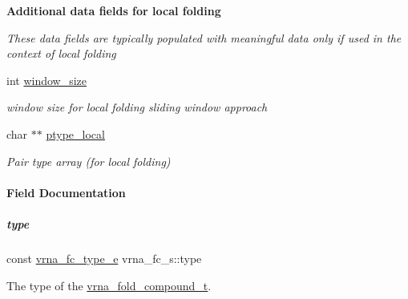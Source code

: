 \begin{Indent}\textbf{ Additional data fields for local folding}\par
{\em These data fields are typically populated with meaningful data only if used in the context of local folding }\begin{DoxyCompactItemize}
\item 
\mbox{\label{group__fold__compound_adacbf7cdfb47d3072683ab509de735f6}} 
int \mbox{\hyperlink{group__fold__compound_adacbf7cdfb47d3072683ab509de735f6}{window\+\_\+size}}
\begin{DoxyCompactList}\small\item\em window size for local folding sliding window approach \end{DoxyCompactList}\item 
\mbox{\label{group__fold__compound_a2ecb8ff5e21190936a8a146be7a251ff}} 
char $\ast$$\ast$ \mbox{\hyperlink{group__fold__compound_a2ecb8ff5e21190936a8a146be7a251ff}{ptype\+\_\+local}}
\begin{DoxyCompactList}\small\item\em Pair type array (for local folding) \end{DoxyCompactList}\end{DoxyCompactItemize}
\end{Indent}


\paragraph{Field Documentation}
\mbox{\label{group__fold__compound_a391bcf8ac5997784aaf780cdd251c464}} 
\subparagraph{\texorpdfstring{type}{type}}
{\footnotesize\ttfamily const \mbox{\hyperlink{group__fold__compound_ga01a4ff86fa71deaaa5d1abbd95a1447d}{vrna\+\_\+fc\+\_\+type\+\_\+e}} vrna\+\_\+fc\+\_\+s\+::type}



The type of the \mbox{\hyperlink{group__fold__compound_ga1b0cef17fd40466cef5968eaeeff6166}{vrna\+\_\+fold\+\_\+compound\+\_\+t}}. 


